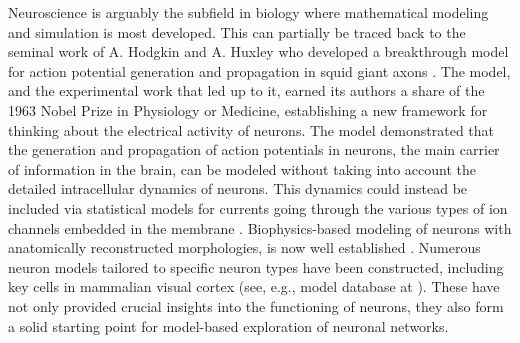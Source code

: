 Neuroscience is arguably the subfield in biology where mathematical modeling and simulation is most developed. This can partially be traced back to the seminal work of A. Hodgkin and A. Huxley who developed a breakthrough model for action potential generation and propagation in squid giant axons \cite{HH_1952}. The model, and the experimental work that led up to it, earned its authors a share of the 1963 Nobel Prize in Physiology or Medicine, establishing a new framework for thinking about the electrical activity of neurons. The model demonstrated that the generation and propagation of action potentials in neurons, the main carrier of information in the brain, can be modeled without taking into account the detailed intracellular dynamics of neurons. This dynamics could instead be included via statistical models for currents going through the various types of ion channels embedded in the membrane \cite{HH_1952}. Biophysics-based modeling of neurons with anatomically reconstructed morphologies, is now well established \cite{Koch_1999, Dayan_2001, Sterratt_2011, Gerstner_2014}. Numerous neuron models tailored to specific neuron types have been constructed, including key cells in mammalian visual cortex (see, e.g., model database at \cite{ModelDB}). These have not only provided crucial insights into the functioning of neurons, they also form a solid starting point for model-based exploration of neuronal networks.